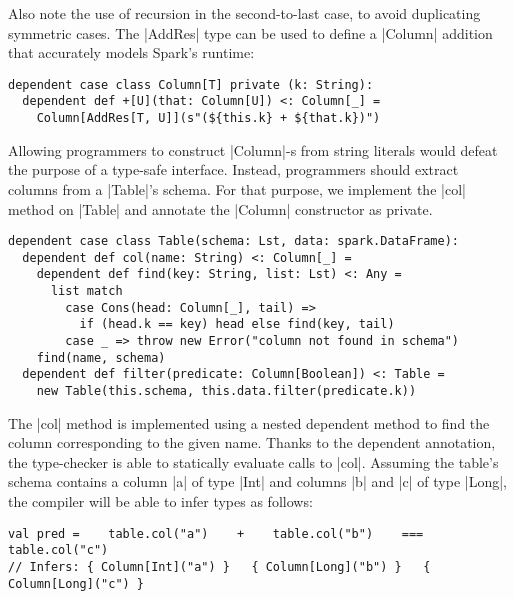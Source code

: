 Also note the use of recursion in the second-to-last case, to avoid duplicating symmetric cases.
The |AddRes| type can be used to define a |Column| addition that accurately models Spark's runtime:

\begin{lstlisting}
dependent case class Column[T] private (k: String):
  dependent def +[U](that: Column[U]) <: Column[_] =
    Column[AddRes[T, U]](s"(${this.k} + ${that.k})")
\end{lstlisting}

Allowing programmers to construct |Column|-s from string literals would defeat the purpose of a type-safe interface.
Instead, programmers should extract columns from a |Table|'s schema.
For that purpose, we implement the |col| method on |Table| and annotate the |Column| constructor as private.

\begin{lstlisting}
dependent case class Table(schema: Lst, data: spark.DataFrame):
  dependent def col(name: String) <: Column[_] =
    dependent def find(key: String, list: Lst) <: Any =
      list match
        case Cons(head: Column[_], tail) =>
          if (head.k == key) head else find(key, tail)
        case _ => throw new Error("column not found in schema")
    find(name, schema)
  dependent def filter(predicate: Column[Boolean]) <: Table =
    new Table(this.schema, this.data.filter(predicate.k))
\end{lstlisting}

The |col| method is implemented using a nested dependent method to find the column corresponding to the given name.
Thanks to the dependent annotation, the type-checker is able to statically evaluate calls to |col|.
Assuming the table's schema contains a column |a| of type |Int| and columns |b| and |c| of type |Long|, the compiler will be able to infer types as follows:

\begin{lstlisting}
val pred =    table.col("a")    +    table.col("b")    ===   table.col("c")
// Infers: { Column[Int]("a") }   { Column[Long]("b") }   { Column[Long]("c") }
\end{lstlisting}

